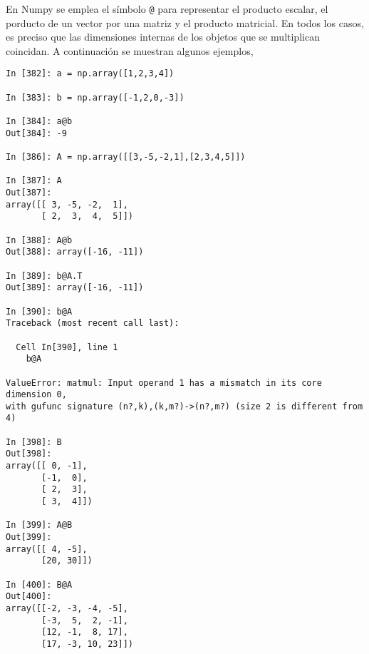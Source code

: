 \begin{paracol}{2}
En Numpy se emplea el símbolo \texttt{@} para representar el producto escalar, el porducto de un vector por una matriz y el producto matricial. En todos los casos, es preciso que las dimensiones internas de los objetos que se multiplican coincidan. A continuación se muestran algunos ejemplos,
\end{paracol}
\begin{center}
    \begin{minipage}{0.7\textwidth}
        \begin{verbatim}
In [382]: a = np.array([1,2,3,4])

In [383]: b = np.array([-1,2,0,-3])

In [384]: a@b
Out[384]: -9

In [386]: A = np.array([[3,-5,-2,1],[2,3,4,5]])

In [387]: A
Out[387]: 
array([[ 3, -5, -2,  1],
       [ 2,  3,  4,  5]])

In [388]: A@b
Out[388]: array([-16, -11])

In [389]: b@A.T
Out[389]: array([-16, -11])

In [390]: b@A
Traceback (most recent call last):

  Cell In[390], line 1
    b@A

ValueError: matmul: Input operand 1 has a mismatch in its core dimension 0, 
with gufunc signature (n?,k),(k,m?)->(n?,m?) (size 2 is different from 4)

In [398]: B
Out[398]: 
array([[ 0, -1],
       [-1,  0],
       [ 2,  3],
       [ 3,  4]])

In [399]: A@B
Out[399]: 
array([[ 4, -5],
       [20, 30]])

In [400]: B@A
Out[400]: 
array([[-2, -3, -4, -5],
       [-3,  5,  2, -1],
       [12, -1,  8, 17],
       [17, -3, 10, 23]])
        \end{verbatim}
    \end{minipage}
\end{center}

